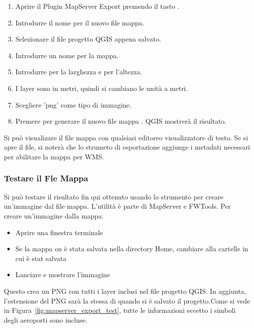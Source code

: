 \begin{enumerate}
  \item Aprire il Plugin MapServer Export premendo il tasto
  .
  \item Introdurre il nome  per il nuovo file mappa.
  \item Selezionare il file progetto QGIS  appena salvato.
  \item Introdurre un nome  per la mappa.
  \item Introdurre  per la larghezza e  per l'altezza.
  \item I layer sono in metri, quindi si cambiano le unità a metri.
  \item Scegliere 'png' come tipo di immagine.
  \item Premere  per generare il nuovo file mappa . 
  QGIS mostrerà il risultato.
\end{enumerate}

Si può visualizare il file mappa con qualsiasi editoreo visualizzatore  di testo. Se si apre il file, si noterà che lo strumeto di esportazione aggiunge i metadati necessari per abilitare la mappa per WMS. 

\subsubsection{Testare il Fle Mappa}

Si può testare il risultato fin qui ottenuto usando lo strumento  per creare un'immagine dal file mappa. L'utilità  è parte di MapServer e FWTools. 
Per creare un'immagine dalla mappa:

\begin{itemize}
\item Aprire una finestra terminale
\item Se la mappa on è stata salvata nella directory Home, cambiare alla cartelle in cui è stat salvata
\item Lanciare  e mostrare l'immagine 
\end{itemize}
 
Questo crea un PNG con tutti i layer inclusi nel file progetto QGIS. 
In aggiunta, l'estensione del PNG sarà la stessa di quando si è salvato il progetto.Come si vede in Figura~\ref{fig:mapserver_export_test}, tutte le informazioni eccetto i simboli degli aeroporti sono incluse.

